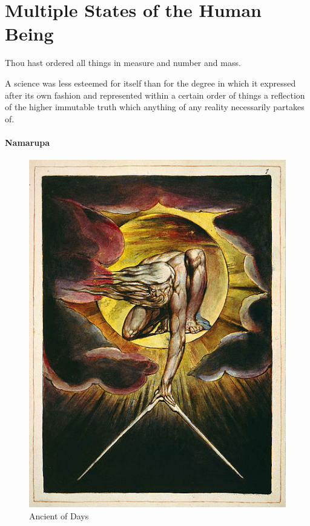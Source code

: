 \section{Multiple States of the Human Being}

\begin{quotex}
Thou hast ordered all things in measure and number and mass. 

A science was less esteemed for itself than for the degree in which it expressed after its own fashion and represented within a certain order of things a reflection of the higher immutable truth which anything of any reality necessarily partakes of. 

\end{quotex}
\paragraph{Namarupa}

\begin{figure}
\centering
 \includegraphics[scale=1]{a20200621MultipleStatesoftheHumanBeing-img001.jpg}
\caption{Ancient of Days}
\end{figure}

